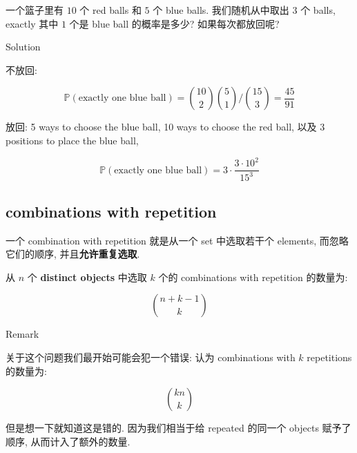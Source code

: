 \begin{example}

一个篮子里有 \(10\) 个 red balls 和 \(5\) 个 blue balls. 我们随机从中取出 \(3\) 个 balls, exactly 其中 \(1\) 个是 blue ball 的概率是多少? 如果每次都放回呢?

\end{example}

\begin{qlsolution}{Solution}

不放回:

\[\mathbb{P}(\text{exactly one blue ball}) = \binom{10}{2}\binom{5}{1}/\binom{15}{3} = \frac{45}{91}\]

放回: 5 ways to choose the blue ball, 10 ways to choose the red ball, 以及 3 positions to place the blue ball,

\[\mathbb{P}(\text{exactly one blue ball}) = 3 \cdot \frac{3 \cdot 10^{2}}{15^{3}}\]

\end{qlsolution}

\subsection{combinations with repetition}\label{combinations-with-repetition}

\begin{definition}{}

一个 combination with repetition 就是从一个 set 中选取若干个 elements, 而忽略它们的顺序, 并且\textbf{允许重复选取}.

\end{definition}

\begin{proposition}

从 \(\mathit{n}\) 个 \textbf{distinct objects} 中选取 \(\mathit{k}\) 个的 combinations with repetition 的数量为:

\[\binom{\mathit{n} + \mathit{k} - 1}{\mathit{k}}\]

\end{proposition}

\begin{qlremark}{Remark}

关于这个问题我们最开始可能会犯一个错误: 认为 combinations with \(\mathit{k}\) repetitions 的数量为:

\[\binom{\mathit{k}\mathit{n}}{\mathit{k}}\]

但是想一下就知道这是错的. 因为我们相当于给 repeated 的同一个 objects 赋予了顺序, 从而计入了额外的数量.

\end{qlremark}

